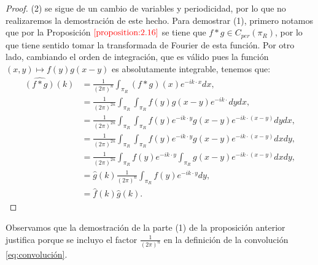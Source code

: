     \begin{proof}
      (2) se sigue de un cambio de variables y periodicidad, por lo que no realizaremos la demostración de este hecho. Para demostrar (1), primero notamos que por la Proposición $\textcolor{red}{\ref{proposition:2.16}}$ se tiene que $f*g \in C_{per}(\pi_R)$, por lo que tiene sentido tomar la transformada de Fourier de esta función. Por otro lado, cambiando el orden de integración, que es válido pues la función $(x,y)\longmapsto f(y)g(x-y)$ es absolutamente integrable, tenemos que:
      \begin{align*}
        \hat{(f*g)}(k)&=\frac{1}{(2\pi)^n}\int_{\pi_R}(f*g)(x)e^{-ik\cdot x} dx,\\
        &=\frac{1}{(2\pi)^{2n}}\int_{\pi_R}\int_{\pi_R}f(y)g(x-y)e^{-ik\cdot}dydx,\\
        &=\frac{1}{(2\pi)^{2n}}\int_{\pi_R}\int_{\pi_R}f(y)e^{-ik\cdot y}g(x-y)e^{-ik\cdot (x-y)}dydx,\\
        &=\frac{1}{(2\pi)^{2n}}\int_{\pi_R}\int_{\pi_R}f(y)e^{-ik\cdot y}g(x-y)e^{-ik\cdot (x-y)}dxdy,\\
        &=\frac{1}{(2\pi)^{2n}}\int_{\pi_R}f(y)e^{-ik\cdot y}\int_{\pi_R}g(x-y)e^{-ik\cdot (x-y)}dxdy,\\
        &=\hat{g}(k)\frac{1}{(2\pi)^{n}}\int_{\pi_R}f(y)e^{-ik\cdot y}dy,\\
        &=\hat{f}(k)\hat{g}(k).
      \end{align*}
    \end{proof}
    Observamos que la demostración de la parte (1) de la proposición anterior justifica porque se incluyo el factor $\frac{1}{(2\pi)^{n}}$ en la definición de la convolución \textcolor{red}{\ref{eq:convolución}}.
